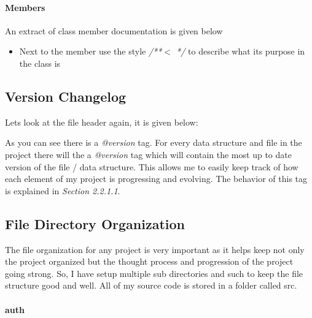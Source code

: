 \paragraph{Members}

An extract of class member documentation is given below



\begin{itemize}
\item{Next to the member use the style {\color{green} \textit{/**$<$  */} } to describe what its purpose in the class is}
\end{itemize}

\subsection{Version Changelog}

Lets look at the file header again, it is given below:



As you can see there is a {\color{green} \textit{@version}} tag. For every data structure and file in the project there will the a  {\color{green} \textit{@version}} tag which will contain the most up to date version of the file / data structure. This allows me to easily keep track of how each element of my project is progressing and evolving. The behavior of this tag is explained in \textit{Section 2.2.1.1}. 

\subsection{File Directory Organization}

The file organization for any project is very important as it helps keep not only the project organized but the thought process and progression of the project going strong. So, I have setup multiple sub directories and such to keep the file structure good and well. All of my source code is stored in a folder called src. 


\paragraph{auth}

